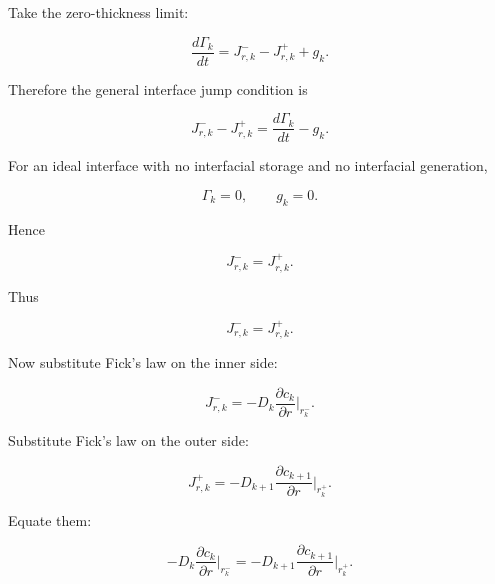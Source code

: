 \documentclass[11pt,a4paper]{article}
\begin{document}
Take the zero-thickness limit:

\begin{equation}
\frac{d\Gamma_k}{dt}
=
J_{r,k}^{-}
-
J_{r,k}^{+}
+
g_k.
\tag{TRISO-INT-107}
\label{eq:triso-int-107}
\end{equation}

Therefore the general interface jump condition is

\begin{equation}
\boxed{
J_{r,k}^{-}-J_{r,k}^{+}
=
\frac{d\Gamma_k}{dt}-g_k.
}
\tag{TRISO-INT-108}
\label{eq:triso-int-108}
\end{equation}

For an ideal interface with no interfacial storage and no interfacial generation,

\begin{equation}
\Gamma_k=0,
\qquad
g_k=0.
\tag{TRISO-INT-109}
\label{eq:triso-int-109}
\end{equation}

Hence

\begin{equation}
J_{r,k}^{-}=J_{r,k}^{+}.
\tag{TRISO-INT-110}
\label{eq:triso-int-110}
\end{equation}

Thus

\begin{equation}
\boxed{
J_{r,k}^{-}=J_{r,k}^{+}.
}
\tag{TRISO-INT-111}
\label{eq:triso-int-111}
\end{equation}

Now substitute Fick's law on the inner side:

\begin{equation}
J_{r,k}^{-}
=
-D_k
\frac{\partial c_k}{\partial r}
\bigg|_{r_k^-}.
\tag{TRISO-INT-112}
\label{eq:triso-int-112}
\end{equation}

Substitute Fick's law on the outer side:

\begin{equation}
J_{r,k}^{+}
=
-D_{k+1}
\frac{\partial c_{k+1}}{\partial r}
\bigg|_{r_k^+}.
\tag{TRISO-INT-113}
\label{eq:triso-int-113}
\end{equation}

Equate them:

\begin{equation}
\boxed{
-D_k
\frac{\partial c_k}{\partial r}
\bigg|_{r_k^-}
=
-D_{k+1}
\frac{\partial c_{k+1}}{\partial r}
\bigg|_{r_k^+}.
}
\tag{TRISO-INT-114}
\label{eq:triso-int-114}
\end{equation}
\end{document}
